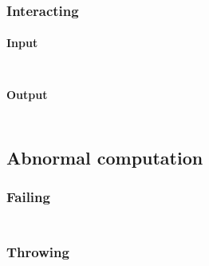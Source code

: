 \subsubsection*{Interacting}\hypertarget{interacting}{}\label{interacting}

\paragraph*{Input}\hypertarget{input}{}\label{input}

\begin{align*}
  [ ~ 
  \KEY{Funcon} ~ & \NAMEHYPER{../../../../../Funcons-beta/Computations/Normal}{Interacting}{read}
  ~ ]
\end{align*}
\paragraph*{Output}\hypertarget{output}{}\label{output}

\begin{align*}
  [ ~ 
  \KEY{Funcon} ~ & \NAMEHYPER{../../../../../Funcons-beta/Computations/Normal}{Interacting}{print}
  ~ ]
\end{align*}
\subsection*{Abnormal computation}\hypertarget{abnormal-computation}{}\label{abnormal-computation}

\subsubsection*{Failing}\hypertarget{failing}{}\label{failing}

\begin{align*}
  [ ~ 
  \KEY{Funcon} ~ & \NAMEHYPER{../../../../../Funcons-beta/Computations/Abnormal}{Failing}{finalise-failing} \\
  \KEY{Funcon} ~ & \NAMEHYPER{../../../../../Funcons-beta/Computations/Abnormal}{Failing}{fail} \\
  \KEY{Funcon} ~ & \NAMEHYPER{../../../../../Funcons-beta/Computations/Abnormal}{Failing}{else} \\
  \KEY{Funcon} ~ & \NAMEHYPER{../../../../../Funcons-beta/Computations/Abnormal}{Failing}{checked} \\
  \KEY{Funcon} ~ & \NAMEHYPER{../../../../../Funcons-beta/Computations/Abnormal}{Failing}{check-true}
  ~ ]
\end{align*}
\subsubsection*{Throwing}\hypertarget{throwing}{}\label{throwing}

